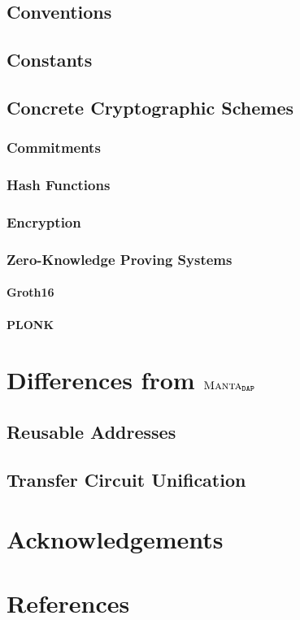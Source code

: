 \documentclass[a4paper]{article}
\newcommand{\subsubsubsection}[1]{\paragraph{#1}}
\newcommand{\lsection}[2]{\def\sectionlabel{#2} \section{#1}\label{sec:#2}}
\newcommand{\MantaDAP}{{\Manta{}_{\texttt{DAP}}}}
\newcommand{\Manta}{{\textsc{Manta}}}
\newcommand{\Transfer}{{\textsf{Transfer}}}
\begin{document}
\subsection{Conventions}

\subsection{Constants}

\subsection{Concrete Cryptographic Schemes}

\subsubsection{Commitments}

\subsubsection{Hash Functions}

\subsubsection{Encryption}

\subsubsection{Zero-Knowledge Proving Systems}

\subsubsubsection{Groth16}

\subsubsubsection{PLONK}

\lsection{Differences from $\MantaDAP$}{differences}

\subsection{Reusable Addresses}

\subsection{\Transfer{} Circuit Unification}

\lsection{Acknowledgements}{acknowledgements}

\lsection{References}{references}
\end{document}
